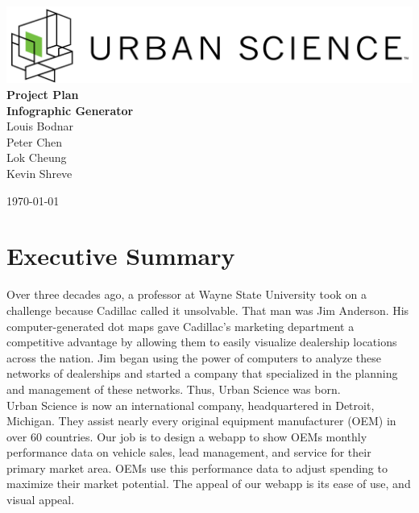 \documentclass[11pt,a4paper,oneside]{article}
\begin{document}
\begin{titlepage}



\begin{center}

\includegraphics[width=1\textwidth]{images/sponsor-logo.png}\\[1cm]    

{ \huge \bfseries Project Plan}\\[0.4cm]
{ \large \bfseries Infographic Generator}\\[0.4cm]

Louis Bodnar\\
Peter Chen\\
Lok Cheung\\
Kevin Shreve\\



\vfill

{\large \today}

\end{center}

\end{titlepage}

\tableofcontents

\newpage

\listoffigures

\newpage

\section{Executive Summary}


Over three decades ago, a professor at Wayne State University took on a challenge because Cadillac called it unsolvable.  That man was Jim Anderson.  His computer-generated dot maps gave Cadillac's marketing department a competitive advantage by allowing them to easily visualize dealership locations across the nation.  Jim began using the power of computers to analyze these networks of dealerships and started a company that specialized in the planning and management of these networks.  Thus, Urban Science was born.\\


Urban Science is now an international company, headquartered in Detroit, Michigan.  They assist nearly every original equipment manufacturer (OEM) in over 60 countries.  Our job is to design a webapp to show OEMs monthly performance data on vehicle sales, lead management, and service for their primary market area.  OEMs use this performance data to adjust spending to maximize their market potential.  The appeal of our webapp is its ease of use, and visual appeal.\\
\end{document}
